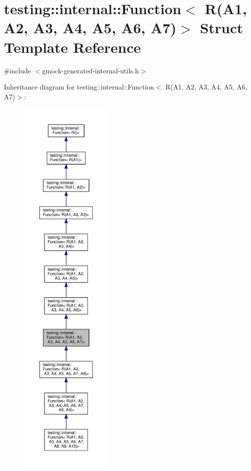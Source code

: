 \hypertarget{structtesting_1_1internal_1_1_function_3_01_r_07_a1_00_01_a2_00_01_a3_00_01_a4_00_01_a5_00_01_a6_00_01_a7_08_4}{}\section{testing\+:\+:internal\+:\+:Function$<$ R(A1, A2, A3, A4, A5, A6, A7)$>$ Struct Template Reference}
\label{structtesting_1_1internal_1_1_function_3_01_r_07_a1_00_01_a2_00_01_a3_00_01_a4_00_01_a5_00_01_a6_00_01_a7_08_4}


{\ttfamily \#include $<$gmock-\/generated-\/internal-\/utils.\+h$>$}



Inheritance diagram for testing\+:\+:internal\+:\+:Function$<$ R(A1, A2, A3, A4, A5, A6, A7)$>$\+:
\nopagebreak
\begin{figure}[H]
\begin{center}
\leavevmode
\includegraphics[height=550pt]{structtesting_1_1internal_1_1_function_3_01_r_07_a1_00_01_a2_00_01_a3_00_01_a4_00_01_a5_00_01_a6_00_01_a7_08_4__inherit__graph}
\end{center}
\end{figure}


